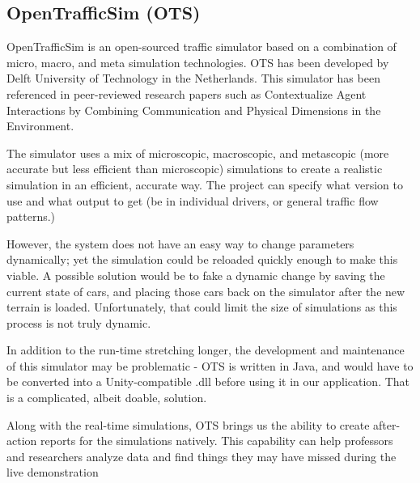 \documentclass[IEEEtran]{article}
\begin{document}
\subsection{OpenTrafficSim (OTS)}
\par OpenTrafficSim is an open-sourced traffic simulator based on a combination of micro, macro, and meta simulation technologies. OTS has been developed by Delft University of Technology in the Netherlands. This simulator has been referenced in peer-reviewed research papers such as Contextualize Agent Interactions by Combining Communication and Physical Dimensions in the Environment\cite{10.1007/978-3-319-18944-4_9}. 
\par The simulator uses a mix of microscopic, macroscopic, and metascopic (more accurate but less efficient than microscopic) simulations to create a realistic simulation in an efficient, accurate way. The project can specify what version to use and what output to get (be in individual drivers, or general traffic flow patterns.)
\par However, the system does not have an easy way to change parameters dynamically; yet the simulation could be reloaded quickly enough to make this viable. A possible solution would be to fake a dynamic change by saving the current state of cars, and placing those cars back on the simulator after the new terrain is loaded. Unfortunately, that could limit the size of simulations as this process is not truly dynamic.
\par In addition to the run-time stretching longer, the development and maintenance of this simulator may be problematic - OTS is written in Java, and would have to be converted into a Unity-compatible .dll before using it in our application. That is a complicated, albeit doable, solution.\cite{5}
\par Along with the real-time simulations, OTS brings us the ability to create after-action reports for the simulations natively. This capability can help professors and researchers analyze data and find things they may have missed during the live demonstration
\end{document}
